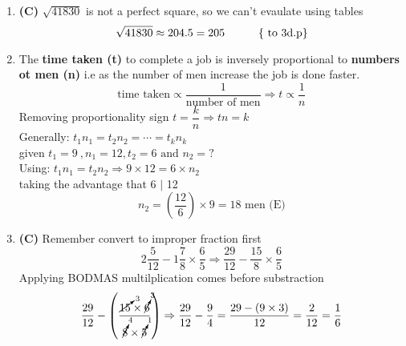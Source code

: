 \begin{multicols}{2}
\begin{enumerate}[label={\textbf{\arabic*.}}]
    \item \textbf{(C) } $ \sqrt{41830}$ is not a perfect square, so we can't evaulate using tables
    \[ \sqrt{41830} \approx 204.5 = 205 \hspace{30px} \text{\{ to 3d.p\}}\]
    \item The \textbf{time taken (t)} to complete a job is inversely proportional to \textbf{numbers ot men (n)} 
    i.e as the number of men increase the job is done faster. 
        \begin{equation}
            \text{time taken} \propto \dfrac{1}{\text{number of men}} \Rightarrow t \propto \dfrac{1}{n} 
        \end{equation}
    Removing proportionality sign
    \(t = \dfrac{k}{n} \Rightarrow tn = k\) \\
    Generally:  \hspace{10px}\(t_{1}n_{1} = t_{2}n_2 = \cdots = t_{k}n_{k}\)\\
    given \(t_{1} = 9\ , n_{1} = 12 , t_{2} = 6 \text{ and } n_{2} = ?\) \\
    Using: \(t_{1}n_{1} = t_{2}n_{2} \Rightarrow 9 \times 12 = 6 \times n_{2}\) \\
    taking the advantage that 6 $\mid$ 12 
    \[n_{2} = \left(\frac{12}{6}\right) \times 9 = 18 \text { men (E)}\]

    \item \textbf{(C)} Remember convert to improper fraction first
    \[2\frac{5}{12} - 1\frac{7}{8} \times \frac{6}{5} \Rightarrow \frac{29}{12} - \frac{15}{8} \times \frac{6}{5}\]
    Applying BODMAS multilplication comes before substraction\\
    \[\dfrac{29}{12} - \left(\dfrac{\cancelto{3}{15} \times \cancelto{3}{6}}{\cancelto{4}{8} \times \cancelto{1}{5}}\right) \Rightarrow \dfrac{29}{12} - \dfrac{9}{4} = \dfrac{29 - (9 \times 3)}{12} = \frac{2}{12} = \frac{1}{6}\]


\end{enumerate}
\end{multicols}
